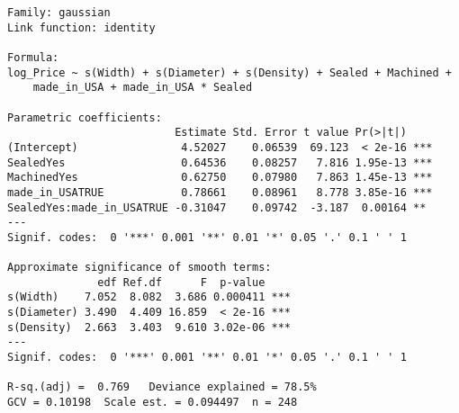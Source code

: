 \begin{verbatim}
Family: gaussian 
Link function: identity 

Formula:
log_Price ~ s(Width) + s(Diameter) + s(Density) + Sealed + Machined + 
    made_in_USA + made_in_USA * Sealed

Parametric coefficients:
                          Estimate Std. Error t value Pr(>|t|)    
(Intercept)                4.52027    0.06539  69.123  < 2e-16 ***
SealedYes                  0.64536    0.08257   7.816 1.95e-13 ***
MachinedYes                0.62750    0.07980   7.863 1.45e-13 ***
made_in_USATRUE            0.78661    0.08961   8.778 3.85e-16 ***
SealedYes:made_in_USATRUE -0.31047    0.09742  -3.187  0.00164 ** 
---
Signif. codes:  0 '***' 0.001 '**' 0.01 '*' 0.05 '.' 0.1 ' ' 1

Approximate significance of smooth terms:
              edf Ref.df      F  p-value    
s(Width)    7.052  8.082  3.686 0.000411 ***
s(Diameter) 3.490  4.409 16.859  < 2e-16 ***
s(Density)  2.663  3.403  9.610 3.02e-06 ***
---
Signif. codes:  0 '***' 0.001 '**' 0.01 '*' 0.05 '.' 0.1 ' ' 1

R-sq.(adj) =  0.769   Deviance explained = 78.5%
GCV = 0.10198  Scale est. = 0.094497  n = 248
\end{verbatim}